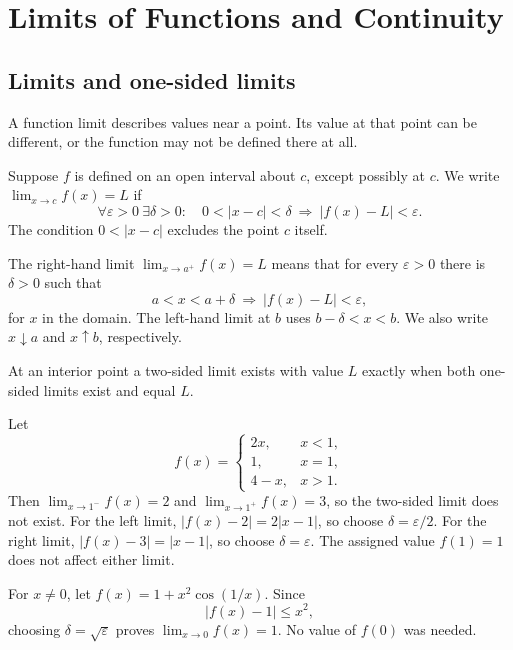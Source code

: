 \chapter{Limits of Functions and Continuity}\label{chap:analysis-continuity}

\section{Limits and one-sided limits}
A function limit describes values near a point. Its value at that point
can be different, or the function may not be defined there at all.

\begin{definition}
Suppose $f$ is defined on an open interval about $c$, except possibly at $c$.
We write $\lim_{x\to c}f(x)=L$ if
\[
\forall\varepsilon>0\ \exists\delta>0:\quad
0<|x-c|<\delta\ \Longrightarrow\ |f(x)-L|<\varepsilon.
\]
The condition $0<|x-c|$ excludes the point $c$ itself.
\end{definition}

\begin{definition}
The right-hand limit $\lim_{x\to a^+}f(x)=L$ means that for every
$\varepsilon>0$ there is $\delta>0$ such that
\[
a<x<a+\delta\ \Longrightarrow\ |f(x)-L|<\varepsilon,
\]
for $x$ in the domain. The left-hand limit at $b$ uses $b-\delta<x<b$.
We also write $x\downarrow a$ and $x\uparrow b$, respectively.
\end{definition}
At an interior point a two-sided limit exists with value $L$ exactly when
both one-sided limits exist and equal $L$.

\begin{example}
Let
\[
f(x)=\begin{cases}2x,&x<1,\\1,&x=1,\\4-x,&x>1.\end{cases}
\]
Then $\lim_{x\to1^-}f(x)=2$ and $\lim_{x\to1^+}f(x)=3$, so the two-sided
limit does not exist. For the left limit,
$|f(x)-2|=2|x-1|$, so choose $\delta=\varepsilon/2$.
For the right limit, $|f(x)-3|=|x-1|$, so choose $\delta=\varepsilon$.
The assigned value $f(1)=1$ does not affect either limit.
\end{example}

\begin{example}
For $x\ne0$, let $f(x)=1+x^2\cos(1/x)$. Since
\[
|f(x)-1|\leq x^2,
\]
choosing $\delta=\sqrt\varepsilon$ proves $\lim_{x\to0}f(x)=1$.
No value of $f(0)$ was needed.
\end{example}

